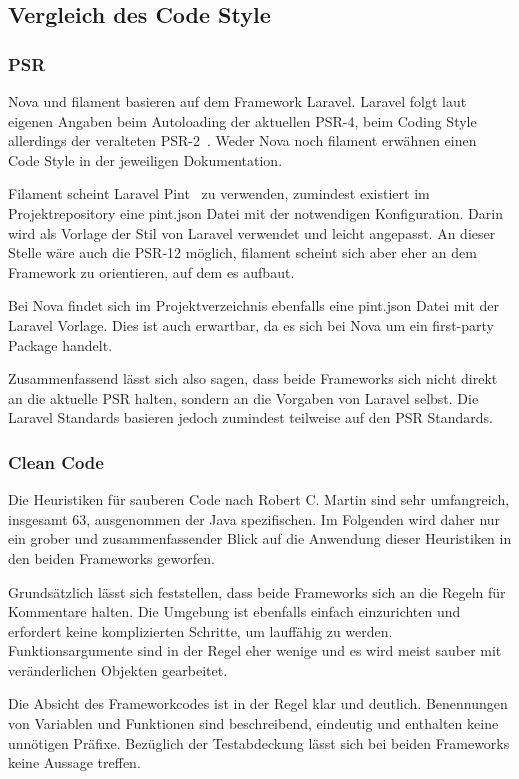 \subsection{Vergleich des Code Style}
\subsubsection{PSR}
Nova und filament basieren auf dem Framework Laravel.
Laravel folgt laut eigenen Angaben beim Autoloading der aktuellen PSR-4, beim Coding Style allerdings der veralteten PSR-2~\cite{laravel-docs-coding-style}.
Weder Nova noch filament erwähnen einen Code Style in der jeweiligen Dokumentation.

Filament scheint Laravel Pint~\cite{laravel-docs-pint} zu verwenden, zumindest existiert im Projektrepository eine pint.json Datei mit der notwendigen Konfiguration.
Darin wird als Vorlage der Stil von Laravel verwendet und leicht angepasst.
An dieser Stelle wäre auch die PSR-12 möglich, filament scheint sich aber eher an dem Framework zu orientieren, auf dem es aufbaut.

Bei Nova findet sich im Projektverzeichnis ebenfalls eine pint.json Datei mit der Laravel Vorlage.
Dies ist auch erwartbar, da es sich bei Nova um ein first-party Package handelt.

Zusammenfassend lässt sich also sagen, dass beide Frameworks sich nicht direkt an die aktuelle PSR halten, sondern an die Vorgaben von Laravel selbst.
Die Laravel Standards basieren jedoch zumindest teilweise auf den PSR Standards.

\subsubsection{Clean Code}
Die Heuristiken für sauberen Code nach Robert C. Martin sind sehr umfangreich, insgesamt 63, ausgenommen der Java spezifischen.
Im Folgenden wird daher nur ein grober und zusammenfassender Blick auf die Anwendung dieser Heuristiken in den beiden Frameworks geworfen.

Grundsätzlich lässt sich feststellen, dass beide Frameworks sich an die Regeln für Kommentare halten.
Die Umgebung ist ebenfalls einfach einzurichten und erfordert keine komplizierten Schritte, um lauffähig zu werden.
Funktionsargumente sind in der Regel eher wenige und es wird meist sauber mit veränderlichen Objekten gearbeitet.

Die Absicht des Frameworkcodes ist in der Regel klar und deutlich.
Benennungen von Variablen und Funktionen sind beschreibend, eindeutig und enthalten keine unnötigen Präfixe.
Bezüglich der Testabdeckung lässt sich bei beiden Frameworks keine Aussage treffen.

